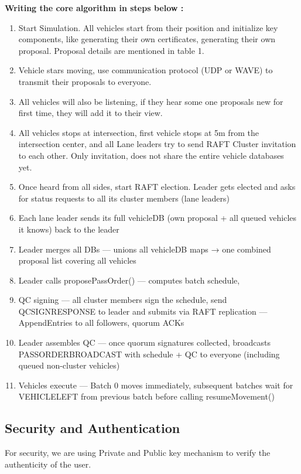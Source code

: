 \documentclass[fleqn,10pt]{olplainarticle}
\begin{document}
\textbf{Writing the core algorithm in steps below : }
\begin{enumerate}
    \item Start Simulation. All vehicles start from their position and initialize key components, like generating their own certificates, generating their own proposal. Proposal details are mentioned in table 1.
    \item Vehicle stars moving, use communication protocol (UDP or WAVE) to transmit their proposals to everyone.
    \item All vehicles will also be listening, if they hear some one proposals new for first time, they will add it to their view. 
    \item All vehicles stops at intersection, first vehicle stops at 5m from the intersection center, and all Lane leaders try to send RAFT Cluster invitation to each other. Only invitation, does not share the entire vehicle databases yet.
    \item Once heard from all sides, start RAFT election. Leader gets elected and asks for status requests to all its cluster members (lane leaders)
    \item Each lane leader sends its full vehicleDB (own proposal + all queued vehicles it knows) back to the leader
    \item Leader merges all DBs — unions all vehicleDB maps → one combined proposal list covering all vehicles
    \item Leader calls proposePassOrder() — computes batch schedule,
    \item QC signing — all cluster members sign the schedule, send QCSIGNRESPONSE to leader and submits via RAFT replication — AppendEntries to all followers, quorum ACKs
    \item Leader assembles QC — once quorum signatures collected, broadcasts PASSORDERBROADCAST with schedule + QC to everyone (including queued non-cluster vehicles)
    \item Vehicles execute — Batch 0 moves immediately, subsequent batches wait for VEHICLELEFT from previous batch before calling resumeMovement()
\end{enumerate}

\subsection{Security and Authentication}
For security, we are using Private and Public key mechanism to verify the authenticity of the user.
\end{document}
